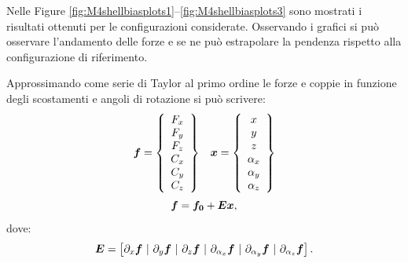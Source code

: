 Nelle Figure \ref{fig:M4shellbiasplots1}--\ref{fig:M4shellbiasplots3} sono mostrati i risultati ottenuti per le configurazioni considerate. Osservando i grafici si può osservare l'andamento delle forze e se ne può estrapolare la pendenza rispetto alla configurazione di riferimento.

Approssimando come serie di Taylor al primo ordine le forze e coppie in funzione degli scostamenti e angoli di rotazione si può scrivere:
\begin{equation}
\label{eq:6fc_xzalfa}
\begin{array}{cc}
\boldsymbol{f} = 
\left\{\begin{array}{c}
F_x\\
F_y\\
F_z\\
C_x\\
C_y\\
C_z\end{array}\right\}
&
\boldsymbol{x} = 
\left\{\begin{array}{c}
x\\
y\\
z\\
\alpha_x\\
\alpha_y\\
\alpha_z\end{array}\right\}
\end{array}
\end{equation}
\begin{equation}
\label{eq:6fc_xzalfa2}
\boldsymbol{f} = \boldsymbol{f_0}+\boldsymbol{E}\boldsymbol{x},
\end{equation}
dove:
\begin{equation}
\label{eq:6fc_xzalfa3}
\boldsymbol{E} = \left[
\partial_x\boldsymbol{f}~|~\partial_y\boldsymbol{f}~|~\partial_z\boldsymbol{f}~|~ \partial_{\alpha_x}\boldsymbol{f}~|~\partial_{\alpha_y}\boldsymbol{f}~|~\partial_{\alpha_z}\boldsymbol{f}\right].
\end{equation}

